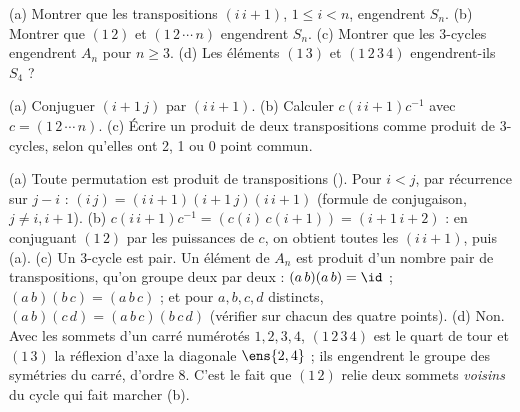\begin{exo}[A][Générateurs de $S_n$ et de $A_n$]
(a) Montrer que les transpositions $(i\,i+1)$, $1\le i<n$, engendrent $S_n$. (b) Montrer que $(1\,2)$ et $(1\,2\,\cdots\,n)$ engendrent $S_n$. (c) Montrer que les 3-cycles engendrent $A_n$ pour $n\ge3$. (d) Les éléments $(1\,3)$ et $(1\,2\,3\,4)$ engendrent-ils $S_4$ ?
\begin{indication}
(a) Conjuguer $(i+1\,j)$ par $(i\,i+1)$. (b) Calculer $c(i\,i+1)c^{-1}$ avec $c=(1\,2\,\cdots\,n)$. (c) Écrire un produit de deux transpositions comme produit de 3-cycles, selon qu'elles ont 2, 1 ou 0 point commun.
\end{indication}
\begin{corrige}
(a) Toute permutation est produit de transpositions (). Pour $i<j$, par récurrence sur $j-i$ : $(i\,j)=(i\,i+1)(i+1\,j)(i\,i+1)$ (formule de conjugaison, $j\neq i,i+1$).
(b) $c(i\,i+1)c^{-1}=(c(i)\,c(i+1))=(i+1\,i+2)$ : en conjuguant $(1\,2)$ par les puissances de $c$, on obtient toutes les $(i\,i+1)$, puis (a).
(c) Un 3-cycle est pair. Un élément de $A_n$ est produit d'un nombre pair de transpositions, qu'on groupe deux par deux : $(a\,b)(a\,b)=\id$ ; $(a\,b)(b\,c)=(a\,b\,c)$ ; et pour $a,b,c,d$ distincts, $(a\,b)(c\,d)=(a\,b\,c)(b\,c\,d)$ (vérifier sur chacun des quatre points).
(d) Non. Avec les sommets d'un carré numérotés $1,2,3,4$, $(1\,2\,3\,4)$ est le quart de tour et $(1\,3)$ la réflexion d'axe la diagonale $\ens{2,4}$ ; ils engendrent le groupe des symétries du carré, d'ordre 8. C'est le fait que $(1\,2)$ relie deux sommets \emph{voisins} du cycle qui fait marcher (b).
\end{corrige}
\end{exo}

